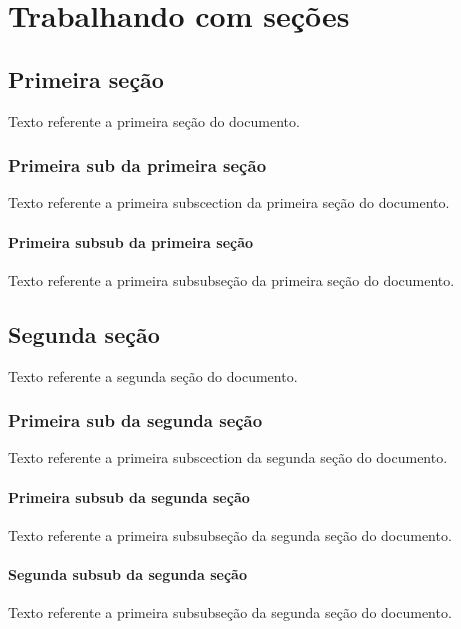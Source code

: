 \documentclass{report}
\begin{document}
	\chapter{Trabalhando com seções}
	
	\section{Primeira seção}
	Texto referente a primeira seção do documento.
	\subsection{Primeira sub da primeira seção}
	Texto referente a primeira subscection da primeira seção do documento.
	\subsubsection{Primeira subsub da primeira seção}
	Texto referente a primeira subsubseção da primeira seção do documento.
	
	\section{Segunda seção}
	Texto referente a segunda seção do documento.
	\subsection{Primeira sub da segunda seção}
	Texto referente a primeira subscection da segunda seção do documento.
	\subsubsection{Primeira subsub da segunda seção}
	Texto referente a primeira subsubseção da segunda seção do documento.
	\subsubsection*{Segunda subsub da segunda seção}
	Texto referente a primeira subsubseção da segunda seção do documento.
\end{document}
